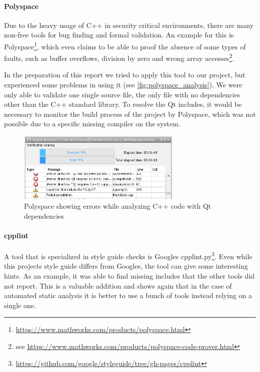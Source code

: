 \documentclass{scrreprt}
\begin{document}
\paragraph{Polyspace} Due to the heavy usage of C++ in security critical environments, there are many non-free tools for bug finding and formal validation. An example for this is Polyspace\footnote{\url{https://www.mathworks.com/products/polyspace.html}}, which even claims to be able to proof the absence of some types of faults, such as buffer overflows, division by zero and wrong array accesses\footnote{see \url{https://www.mathworks.com/products/polyspace-code-prover.html}}.

In the preparation of this report we tried to apply this tool to our project, but experienced some problems in using it (see \vref{fig:polyspace_analysis}). We were only able to validate one single source file, the only file with no dependencies other than the C++ standard library. To resolve the Qt includes, it would be necessary to monitor the build process of the project by Polyspace, which was not possible due to a specific missing compiler on the system.

\begin{figure}[h]
	\centering
	\includegraphics[width=0.7\textwidth]{img/polyspace_analysis}
	\caption[Polyspace Analysis]{Polyspace showing errors while analyzing C++ code with Qt dependencies}
	\label{fig:polyspace_analysis}
\end{figure}

\paragraph{cpplint} A tool that is specialized in style guide checks is Googles cpplint.py\footnote{\url{https://github.com/google/styleguide/tree/gh-pages/cpplint}}. Even while this projects style guide differs from Googles, the tool can give some interesting hints. As an example, it was able to find missing includes that the other tools did not report. This is a valuable addition and shows again that in the case of automated static analysis it is better to use a bunch of tools instead relying on a single one.
\end{document}
